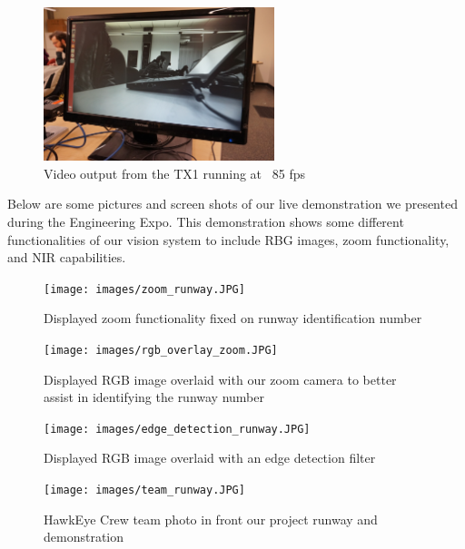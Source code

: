 \begin{figure}[!ht]
\centering
\includegraphics[width=0.6\textwidth]{images/exampleOutputNormalBeta.jpg}
\caption{Video output from the TX1 running at ~85 fps}
\end{figure}

Below are some pictures and screen shots of our live demonstration we presented during the Engineering Expo. This demonstration shows some different functionalities of our vision system to include RBG images, zoom functionality, and NIR capabilities.

\begin{figure}[!ht]
\centering
\texttt{[image: images/zoom\_runway.JPG]}
\caption{Displayed zoom functionality fixed on runway identification number}
\end{figure}

\begin{figure}[!ht]
\centering
\texttt{[image: images/rgb\_overlay\_zoom.JPG]}
\caption{Displayed RGB image overlaid with our zoom camera to better assist in identifying the runway number}
\end{figure}

\begin{figure}[!ht]
\centering
\texttt{[image: images/edge\_detection\_runway.JPG]}
\caption{Displayed RGB image overlaid with an edge detection filter}
\end{figure}

\begin{figure}[!ht]
\centering
\texttt{[image: images/team\_runway.JPG]}
\caption{HawkEye Crew team photo in front our project runway and demonstration}
\end{figure}